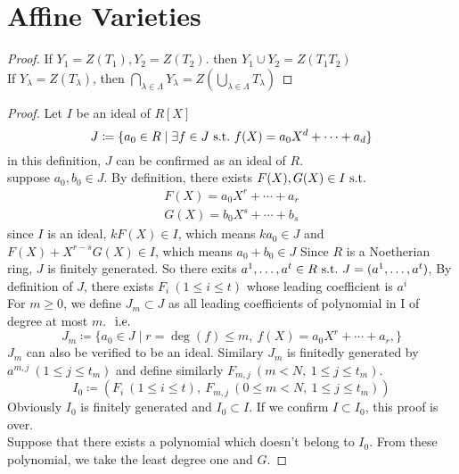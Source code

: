 \documentclass[leqno]{ltjsarticle}
\begin{document}
\section{Affine Varieties}
\begin{proof}
	If $Y_1=Z(T_1), Y_2=Z(T_2)$. then $Y_1\cup Y_2=Z(T_1T_2)$\\
	If $Y_{\lambda}=Z(T_{\lambda})$, then $\bigcap_{\lambda\in\Lambda}Y_\lambda = Z(\bigcup_{\lambda\in\Lambda}T_{\lambda})$
\end{proof}
\begin{proof}
	Let $I$ be an ideal of $R[X]$\\
	\[J\coloneq\{a_0\in R\mid \exists f\in J\ \mathrm{s.t.}\  f(X) = a_0X^d + \cdots + a_d\}\]
	in this definition, $J$ can be confirmed as an ideal of $R$.\\
	\because suppose $a_0 , b_0 \in J$. By definition, there exists $F(X), G(X)\in I \ \mathrm{s.t.}\ $
	\begin{gather*}
		F(X) = a_0X^r + \cdots + a_r\\
		G(X) = b_0X^s + \cdots + b_s
	\end{gather*}
	since $I$ is an ideal, $kF(X) \in I$, which means $ka_0\in J$ and $F(X) + X^{r-s}G(X) \in I$, which means $a_0 + b_0 \in J$
	Since $R$ is a Noetherian ring, $J$ is finitely generated. So there exits $a^1,\ldots, a^t \in R\ \mathrm{s.t.}\  J=(a^1,\ldots, a^t)$, By definition of $J$, there exists $F_i\ (1\le i \le t)$ whose leading coefficient is $a^i$\\
	For $m\ge 0$, we define $J_m\subset J$ as all leading coefficients of polynomial in I of degree at most $m$. $\ \mathrm{i.e.}\ $
	\[J_m \coloneq \{a_0 \in J\mid r= \deg(f) \leq m,\ f(X) = a_0X^r + \cdots + a_r, \}\]
	$J_m$ can also be verified to be an ideal. Similary $J_m$ is finitedly generated by $a^{m,j}\ (1\le j\le t_m)$ and define similarly $F_{m,j}\ (m<N,\ 1\le j\le t_m)$.\\
	\[I_0\coloneq (F_i\ (1\le i \le t),\ F_{m,j}\ (0\le m< N,\ 1\le j\le t_m))\]
	Obviously $I_0$ is finitely generated and $I_0 \subset I$. If we confirm $I\subset I_0$, this proof is over.\\
	Suppose that there exists a polynomial which doesn't belong to $I_0$. From these polynomial, we take the least degree one and $G$.
\end{proof}
\end{document}
